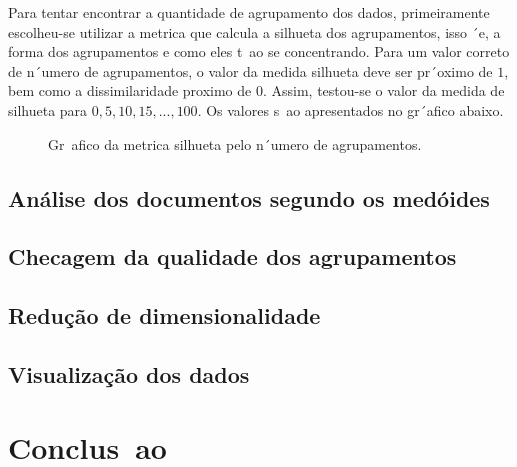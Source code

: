 \documentclass[conference]{IEEEtran}
\begin{document}
Para tentar encontrar a quantidade de agrupamento dos dados, primeiramente escolheu-se utilizar a metrica que calcula a silhueta dos agrupamentos, isso ´e, a forma dos agrupamentos e como eles t~ao se concentrando. Para um valor correto de n´umero de agrupamentos, o valor da medida silhueta deve ser pr´oximo de $1$, bem como a dissimilaridade proximo de $0$. Assim, testou-se o valor da medida de silhueta para $0, 5, 10, 15, ..., 100$. Os valores s~ao apresentados no gr´afico abaixo.

\begin{figure}[!h]
	\centering
	{
		\setlength{\fboxsep}{1pt}
		\setlength{\fboxrule}{1pt}
	}
	\caption{\small Gr~afico da metrica silhueta pelo n´umero de agrupamentos.}
	\label{fig:confusion}
\end{figure}



\subsection{Análise dos documentos segundo os medóides}

\subsection{Checagem da qualidade dos agrupamentos}

\subsection{Redução de dimensionalidade}

\subsection{Visualização dos dados}

\section{Conclus~ao}
\end{document}
